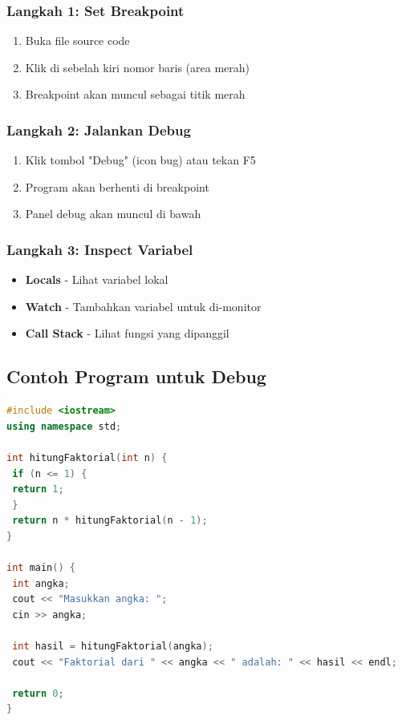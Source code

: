 \subsubsection{Langkah 1: Set Breakpoint}

\begin{enumerate}
\item Buka file source code
\item Klik di sebelah kiri nomor baris (area merah)
\item Breakpoint akan muncul sebagai titik merah
\end{enumerate}

\subsubsection{Langkah 2: Jalankan Debug}

\begin{enumerate}
\item Klik tombol "Debug" (icon bug) atau tekan F5
\item Program akan berhenti di breakpoint
\item Panel debug akan muncul di bawah
\end{enumerate}

\subsubsection{Langkah 3: Inspect Variabel}

\begin{itemize}
\item \textbf{Locals} - Lihat variabel lokal
\item \textbf{Watch} - Tambahkan variabel untuk di-monitor
\item \textbf{Call Stack} - Lihat fungsi yang dipanggil
\end{itemize}

\subsection{Contoh Program untuk Debug}

\begin{lstlisting}[language=c++, caption=Program untuk Latihan Debug]
#include <iostream>
using namespace std;

int hitungFaktorial(int n) {
 if (n <= 1) {
 return 1;
 }
 return n * hitungFaktorial(n - 1);
}

int main() {
 int angka;
 cout << "Masukkan angka: ";
 cin >> angka;

 int hasil = hitungFaktorial(angka);
 cout << "Faktorial dari " << angka << " adalah: " << hasil << endl;

 return 0;
}
\end{lstlisting}

